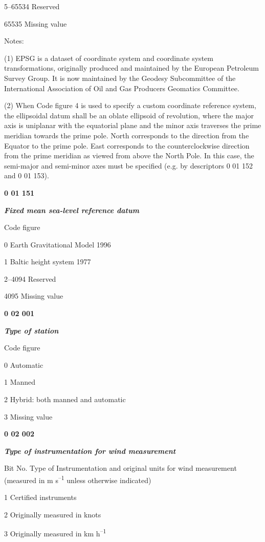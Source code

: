 5--65534 Reserved

65535 Missing value

Notes:

(1) EPSG is a dataset of coordinate system and coordinate system transformations, originally produced and maintained by the European Petroleum Survey Group. It is now maintained by the Geodesy Subcommittee of the International Association of Oil and Gas Producers Geomatics Committee.

(2) When Code figure 4 is used to specify a custom coordinate reference system, the ellipsoidal datum shall be an oblate ellipsoid of revolution, where the major axis is uniplanar with the equatorial plane and the minor axis traverses the prime meridian towards the prime pole. North corresponds to the direction from the Equator to the prime pole. East corresponds to the counterclockwise direction from the prime meridian as viewed from above the North Pole. In this case, the semi-major and semi-minor axes must be specified (e.g. by descriptors 0 01 152 and 0 01 153).

\textbf{0 01 151}

\emph{\textbf{Fixed mean sea-level reference datum}}

Code figure

0 Earth Gravitational Model 1996

1 Baltic height system 1977

2--4094 Reserved

4095 Missing value

\textbf{0 02 001}

\emph{\textbf{Type of station}}

Code figure

0 Automatic

1 Manned

2 Hybrid: both manned and automatic

3 Missing value

\textbf{0 02 002}

\emph{\textbf{Type of instrumentation for wind measurement}}

Bit No. Type of Instrumentation and original units for wind measurement\\
(measured in m s\textsuperscript{--1} unless otherwise indicated)

1 Certified instruments

2 Originally measured in knots

3 Originally measured in km h\textsuperscript{--1}


